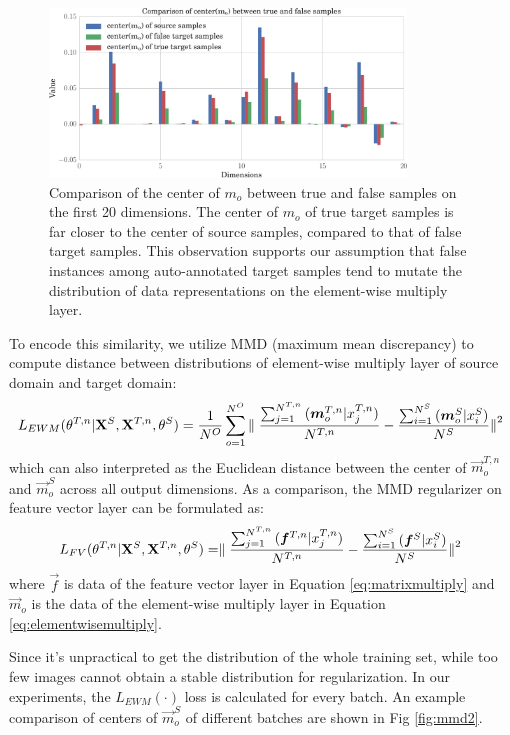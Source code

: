 \documentclass[runningheads]{llncs}
\begin{document}
\begin{figure}
\centering
\includegraphics[height=4.5cm]{images/mmd.pdf}
\caption{Comparison of the center of $m_{o}$ between true and false samples on the first 20 dimensions. The center of $m_{o}$ of true target samples is far closer to the center of source samples, compared to that of false target samples. This observation supports our assumption that false instances among auto-annotated target samples tend to mutate the distribution of data representations on the element-wise multiply layer.}
\label{fig:mmd}
\end{figure}

To encode this similarity, we utilize MMD (maximum mean discrepancy) to compute distance between distributions of element-wise multiply layer of source domain and target domain:
\begin{equation}\label{equation:LMMD}
  L_{EWM}(\theta^{T,n}|{\bf X}^{S},{\bf X}^{T,n},\theta^{S}) = \frac{1}{N^{O}} \sum^{N^{O}}_{o=1}{ \parallel \frac{\sum^{N^{T,n}}_{j=1}{(\vec{m}^{T,n}_{o}|x^{T,n}_{j})}}{N^{T,n}} - \frac{\sum^{N^{S}}_{i=1}{(\vec{m}^{S}_{o}|x^{S}_{i})}}{N^{S}} {\parallel}^{2}  }
\end{equation}
which can also interpreted as the Euclidean distance between the center of $\vec{m}^{T,n}_{o}$ and $\vec{m}^{S}_{o}$ across all output dimensions. As a comparison, the MMD regularizer on feature vector layer can be formulated as:
\begin{equation}\label{equation:LMMD}
  L_{FV}(\theta^{T,n}|{\bf X}^{S},{\bf X}^{T,n},\theta^{S}) = \parallel \frac{\sum^{N^{T,n}}_{j=1}{(\vec{f}^{T,n}|x^{T,n}_{j})}}{N^{T,n}} - \frac{\sum^{N^{S}}_{i=1}{(\vec{f}^{S}|x^{S}_{i})}}{N^{S}} {\parallel}^{2}
\end{equation}
where $\vec{f}$ is data of the feature vector layer in Equation \ref{eq:matrixmultiply} and $\vec{m}_{o}$ is the data of the element-wise multiply layer in Equation \ref{eq:elementwisemultiply}.

Since it's unpractical to get the distribution of the whole training set, while too few images cannot obtain a stable distribution for regularization. In our experiments, the $L_{EWM}(\cdot)$ loss is calculated for every batch. An example comparison of centers of $\vec{m}^{S}_{o}$ of different batches are shown in Fig \ref{fig:mmd2}.
\end{document}
